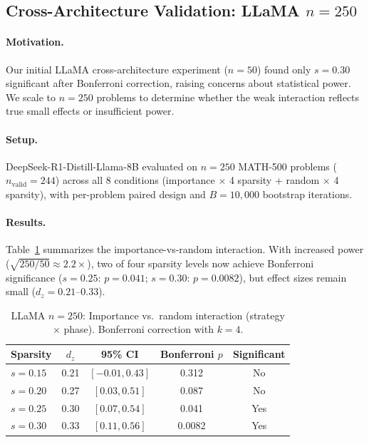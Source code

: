 \documentclass[11pt]{article}
\begin{document}
\subsection{Cross-Architecture Validation: LLaMA $n=250$}
\label{sec:llama}

\paragraph{Motivation.} Our initial LLaMA cross-architecture experiment ($n=50$) found only $s=0.30$ significant after Bonferroni correction, raising concerns about statistical power. We scale to $n=250$ problems to determine whether the weak interaction reflects true small effects or insufficient power.

\paragraph{Setup.} DeepSeek-R1-Distill-Llama-8B evaluated on $n=250$ MATH-500 problems ($n_{\text{valid}}=244$) across all 8 conditions (importance $\times$ 4 sparsity + random $\times$ 4 sparsity), with per-problem paired design and $B=10{,}000$ bootstrap iterations.

\paragraph{Results.} Table~\ref{tab:llama_n250} summarizes the importance-vs-random interaction. With increased power ($\sqrt{250/50} \approx 2.2\times$), two of four sparsity levels now achieve Bonferroni significance ($s=0.25$: $p=0.041$; $s=0.30$: $p=0.0082$), but effect sizes remain small ($d_z = 0.21$--$0.33$).

\begin{table}[t]
\centering
\caption{LLaMA $n=250$: Importance vs.\ random interaction (strategy $\times$ phase). Bonferroni correction with $k=4$.}
\label{tab:llama_n250}
\begin{tabular}{lcccc}
\toprule
Sparsity & $d_z$ & 95\% CI & Bonferroni $p$ & Significant \\
\midrule
$s=0.15$ & 0.21 & $[-0.01, 0.43]$ & 0.312 & No \\
$s=0.20$ & 0.27 & $[0.03, 0.51]$ & 0.087 & No \\
$s=0.25$ & 0.30 & $[0.07, 0.54]$ & 0.041 & Yes \\
$s=0.30$ & 0.33 & $[0.11, 0.56]$ & 0.0082 & Yes \\
\bottomrule
\end{tabular}
\end{table}
\end{document}
